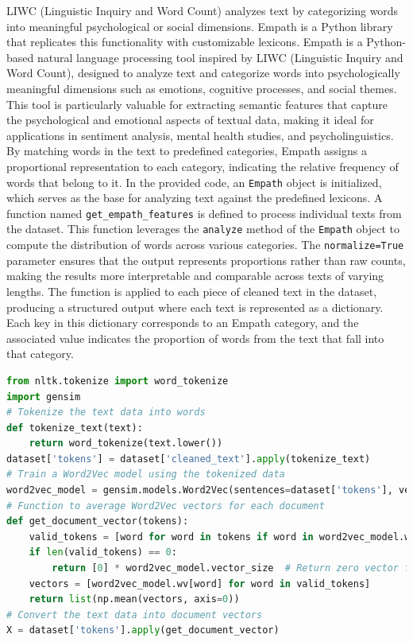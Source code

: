 \noindent
LIWC (Linguistic Inquiry and Word Count) analyzes text by categorizing words into meaningful psychological or social dimensions. Empath is a Python library that replicates this functionality with customizable lexicons. Empath is a Python-based natural language processing tool inspired by LIWC (Linguistic Inquiry and Word Count), designed to analyze text and categorize words into psychologically meaningful dimensions such as emotions, cognitive processes, and social themes. This tool is particularly valuable for extracting semantic features that capture the psychological and emotional aspects of textual data, making it ideal for applications in sentiment analysis, mental health studies, and psycholinguistics. By matching words in the text to predefined categories, Empath assigns a proportional representation to each category, indicating the relative frequency of words that belong to it. In the provided code, an \texttt{Empath} object is initialized, which serves as the base for analyzing text against the predefined lexicons. A function named \texttt{get\_empath\_features} is defined to process individual texts from the dataset. This function leverages the \texttt{analyze} method of the \texttt{Empath} object to compute the distribution of words across various categories. The \texttt{normalize=True} parameter ensures that the output represents proportions rather than raw counts, making the results more interpretable and comparable across texts of varying lengths. The function is applied to each piece of cleaned text in the dataset, producing a structured output where each text is represented as a dictionary. Each key in this dictionary corresponds to an Empath category, and the associated value indicates the proportion of words from the text that fall into that category. 

\begin{tcolorbox}[colback=gray!5!white, colframe=gray!80!black, boxrule=0.5pt, title=Word2Vec]
\begin{lstlisting}[language=Python]
from nltk.tokenize import word_tokenize
import gensim
# Tokenize the text data into words
def tokenize_text(text):
    return word_tokenize(text.lower())
dataset['tokens'] = dataset['cleaned_text'].apply(tokenize_text)
# Train a Word2Vec model using the tokenized data
word2vec_model = gensim.models.Word2Vec(sentences=dataset['tokens'], vector_size=100, window=5, min_count=1, workers=4)
# Function to average Word2Vec vectors for each document
def get_document_vector(tokens):
    valid_tokens = [word for word in tokens if word in word2vec_model.wv]
    if len(valid_tokens) == 0:
        return [0] * word2vec_model.vector_size  # Return zero vector for empty documents
    vectors = [word2vec_model.wv[word] for word in valid_tokens]
    return list(np.mean(vectors, axis=0))
# Convert the text data into document vectors
X = dataset['tokens'].apply(get_document_vector)
\end{lstlisting}
\end{tcolorbox}

